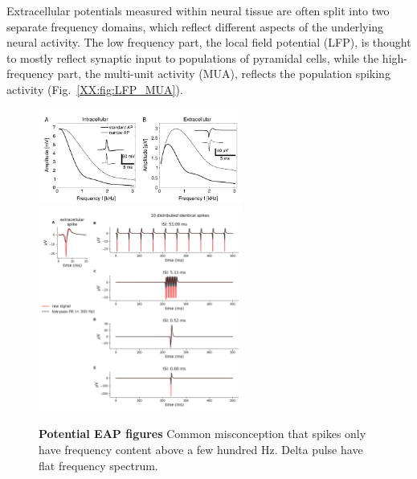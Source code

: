 Extracellular potentials measured within neural tissue are often split into two separate frequency domains, which reflect different aspects of the underlying neural activity. The low frequency part, the local field potential (LFP), is thought to mostly reflect synaptic input to populations of pyramidal cells, while the high-frequency part, the multi-unit activity (MUA), reflects the population spiking activity (Fig.~\ref{XX:fig:LFP_MUA}).
\begin{figure}[!ht]
\begin{center}
\includegraphics[width=0.6\textwidth]{Figures/Spikes/Spikes-eap_illustration.png}
\includegraphics[width=0.6\textwidth]{Figures/Spikes/Spikes-LFP_spike_effect_test_300Hz.png}
\end{center}
\caption{\textbf{Potential EAP figures} 
Common misconception that spikes only have frequency content above a few hundred Hz. Delta pulse have flat frequency spectrum.}
\label{Spikes:fig:freq_dep}
\end{figure}

\section{}
\label{Spikes:sec:EP-spikes}
%





